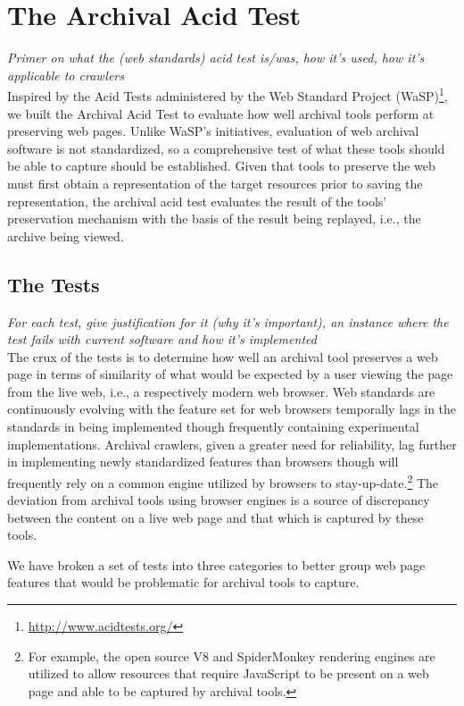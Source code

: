 \documentclass{acm_proc}
\newcommand{\todo}[1]{{\textit{\color{red}#1}}}
\begin{document}
\section{The Archival Acid Test}
\todo{Primer on what the (web standards) acid test is/was, how it's used, how it's applicable to crawlers\\}
Inspired by the Acid Tests administered by the Web Standard Project (WaSP)\footnote{\url{http://www.acidtests.org/}}, we built the Archival Acid Test to evaluate how well archival tools perform at preserving web pages. Unlike WaSP's initiatives, evaluation of web archival software is not standardized, so a comprehensive test of what these tools should be able to capture should be established. Given that tools to preserve the web must first obtain a representation \cite{rfc2616} of the target resources prior to saving the representation, the archival acid test evaluates the result of the tools' preservation mechanism with the basis of the result being replayed, i.e., the archive being viewed.

\subsection{The Tests}
\todo{For each test, give justification for it (why it's important), an instance where the test fails with current software and how it's implemented\\}
The crux of the tests is to determine how well an archival tool preserves a web page in terms of similarity of what would be expected by a user viewing the page from the live web, i.e., a respectively modern web browser.  Web standards are continuously evolving with the feature set for web browsers temporally lags in the standards in being implemented though frequently containing experimental implementations. Archival crawlers, given a greater need for reliability, lag further in implementing newly standardized features than browsers though will frequently rely on a common engine utilized by browsers to stay-up-date.\footnote{For example, the open source V8 and SpiderMonkey rendering engines are utilized to allow resources that require JavaScript to be present on a web page and able to be captured by archival tools.} The deviation from archival tools using browser engines is a source of discrepancy between the content on a live web page and that which is captured by these tools.

We have broken a set of tests into three categories to better group web page features that would be problematic for archival tools to capture. 
\end{document}
